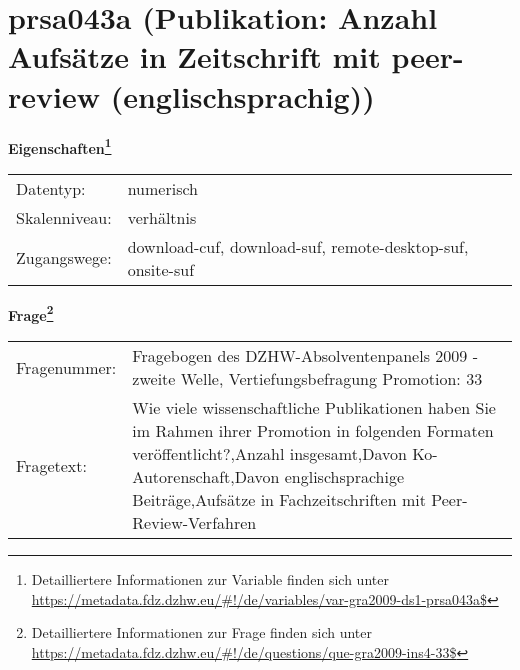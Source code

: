 
    \setcounter{footnote}{0}

    \vspace*{-1.8cm}
	\section{prsa043a (Publikation: Anzahl Aufsätze in Zeitschrift mit peer-review (englischsprachig))}
	\label{section:prsa043a}



    \vspace*{0.5cm}
    \noindent\textbf{Eigenschaften\footnote{Detailliertere Informationen zur Variable finden sich unter
		\url{https://metadata.fdz.dzhw.eu/\#!/de/variables/var-gra2009-ds1-prsa043a$}}}\\
	\begin{tabularx}{\hsize}{@{}lX}
	Datentyp: & numerisch \\
	Skalenniveau: & verhältnis \\
	Zugangswege: &
	  download-cuf, 
	  download-suf, 
	  remote-desktop-suf, 
	  onsite-suf
 \\
    \end{tabularx}



				\vspace*{0.5cm}
                \noindent\textbf{Frage\footnote{Detailliertere Informationen zur Frage finden sich unter
		              \url{https://metadata.fdz.dzhw.eu/\#!/de/questions/que-gra2009-ins4-33$}}}\\
				\begin{tabularx}{\hsize}{@{}lX}
					Fragenummer: &
					  Fragebogen des DZHW-Absolventenpanels 2009 - zweite Welle, Vertiefungsbefragung Promotion:
					  33
 \\
					Fragetext: & Wie viele wissenschaftliche Publikationen haben Sie im Rahmen ihrer Promotion in folgenden Formaten veröffentlicht?,Anzahl insgesamt,Davon Ko-Autorenschaft,Davon englischsprachige Beiträge,Aufsätze in Fachzeitschriften mit Peer-Review-Verfahren \\
				\end{tabularx}





